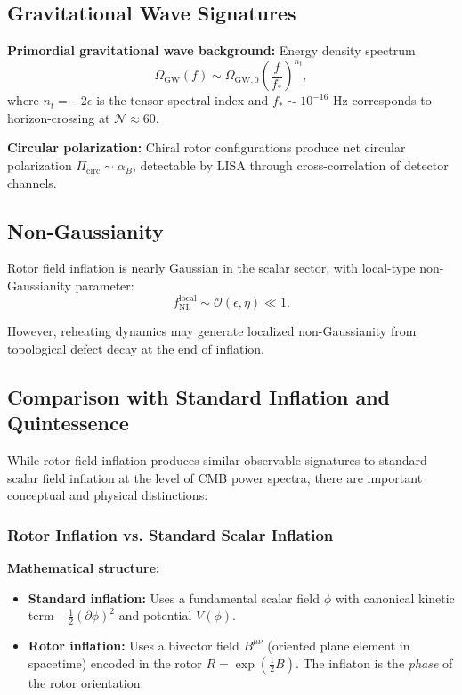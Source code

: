 \documentclass[11pt,a4paper]{article}
\numberwithin{equation}{section}
\theoremstyle{plain}
\theoremstyle{definition}
\theoremstyle{remark}
\begin{document}
\subsection{Gravitational Wave Signatures}

\textbf{Primordial gravitational wave background:} Energy density spectrum
\begin{equation}
\Omega_{\mathrm{GW}}(f) \sim \Omega_{\mathrm{GW},0}\left(\frac{f}{f_*}\right)^{n_t},
\end{equation}
where $n_t = -2\epsilon$ is the tensor spectral index and $f_* \sim 10^{-16}$ Hz corresponds to horizon-crossing at $\mathcal{N} \approx 60$.

\textbf{Circular polarization:} Chiral rotor configurations produce net circular polarization $\Pi_{\mathrm{circ}} \sim \alpha_B$, detectable by LISA through cross-correlation of detector channels.

\subsection{Non-Gaussianity}

Rotor field inflation is nearly Gaussian in the scalar sector, with local-type non-Gaussianity parameter:
\begin{equation}
f_{\mathrm{NL}}^{\mathrm{local}} \sim \mathcal{O}(\epsilon, \eta) \ll 1.
\end{equation}

However, reheating dynamics may generate localized non-Gaussianity from topological defect decay at the end of inflation.

\subsection{Comparison with Standard Inflation and Quintessence}
\label{sec:comparison}

While rotor field inflation produces similar observable signatures to standard scalar field inflation at the level of CMB power spectra, there are important conceptual and physical distinctions:

\subsubsection{Rotor Inflation vs. Standard Scalar Inflation}

\textbf{Mathematical structure:}
\begin{itemize}
  \item \textbf{Standard inflation:} Uses a fundamental scalar field $\phi$ with canonical kinetic term $-\frac{1}{2}(\partial\phi)^2$ and potential $V(\phi)$.
  \item \textbf{Rotor inflation:} Uses a bivector field $B^{\mu\nu}$ (oriented plane element in spacetime) encoded in the rotor $R = \exp(\frac{1}{2}B)$. The inflaton is the \emph{phase} of the rotor orientation.
\end{itemize}
\end{document}

